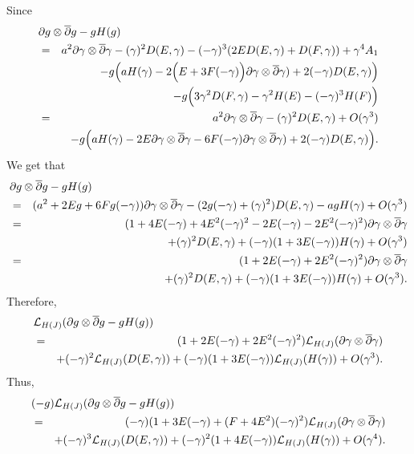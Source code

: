 \documentclass[12pt]{amsart}
\def\d{\partial}
\def\dbar{\overline{\partial}}
\def\d{\partial}
\def\cal{\mathcal}
\begin{document}
Since
\begin{eqnarray*}
\lefteqn{\d g\otimes \dbar g- gH(g)}\\
&=&a^2  \d \gamma \otimes \dbar \gamma -(\gamma)^2  D(E,\gamma) -(-\gamma)^3 ( 2E D(E, \gamma)+ D(F, \gamma) )+\gamma^4 A_1\\
&&- g\Big(a H(\gamma)-2\Big( E+3F(-\gamma) \Big)  \d \gamma \otimes \dbar \gamma) +2 (-\gamma) D(E, \gamma)\Big)
\\
&&-g \Big(3 \gamma^2 D(F, \gamma)
-  \gamma^2 H(E) -(-\gamma)^3 H(F)\Big)\\
&=&a^2  \d \gamma \otimes \dbar \gamma -(\gamma)^2  D(E,\gamma) +O(\gamma^3)\\
&&- g\Big(a H(\gamma)-2E \d \gamma \otimes \dbar \gamma -6F(-\gamma)  \d \gamma \otimes \dbar \gamma) +2 (-\gamma) D(E, \gamma)\Big).
\end{eqnarray*}
We get that
\begin{eqnarray*}
\lefteqn{\d g\otimes \dbar g- gH(g)}\\
&=&(a^2 +2E g  +6F g(-\gamma)) \d \gamma \otimes \dbar \gamma -(2g (-\gamma)+(\gamma)^2 ) D(E,\gamma)-a g H(\gamma)+ O(\gamma^3) \\
&=&(1+4E(-\gamma)+4E^2(-\gamma)^2 -2E (-\gamma)-2E^2(-\gamma)^2  ) \d \gamma \otimes \dbar \gamma \\
&&+(\gamma)^2  D(E,\gamma)+(-\gamma)(1+3E(-\gamma)) H(\gamma)+ O(\gamma^3) \\
&=&(1+2E(-\gamma)+2E^2(-\gamma)^2  ) \d \gamma \otimes \dbar \gamma \\
&&+(\gamma)^2  D(E,\gamma)+(-\gamma)(1+3E(-\gamma)) H(\gamma)+ O(\gamma^3). 
\end{eqnarray*}
Therefore,
\begin{eqnarray*}
\lefteqn{{\cal L}_{H(J)} (\d g\otimes \dbar g- gH(g))}\\
&=& (1+2E(-\gamma)+2E^2(-\gamma)^2  ) {\cal L}_{H(J)} (\d \gamma \otimes \dbar \gamma) \\
&&+(-\gamma)^2  {\cal L}_{H(J)} (D(E,\gamma))+(-\gamma)(1+3E(-\gamma)) {\cal  L}_{H(J)}(H(\gamma))+ O(\gamma^3).
\end{eqnarray*}
Thus,
\begin{eqnarray*}
\lefteqn{(-g) {\cal L}_{H(J)} (\d g\otimes \dbar g- gH(g))}\\
&=&(-\gamma) (1+3E(-\gamma)+(F+4E^2)(-\gamma)^2  ) {\cal L}_{H(J)} (\d \gamma \otimes \dbar \gamma) \\
&&+(-\gamma)^3 {\cal L}_{H(J)}(D(E,\gamma))+(-\gamma)^2(1+4E(-\gamma)) {\cal  L}_{H(J)} (H(\gamma))+ O(\gamma^4).
\end{eqnarray*}
\end{document}

